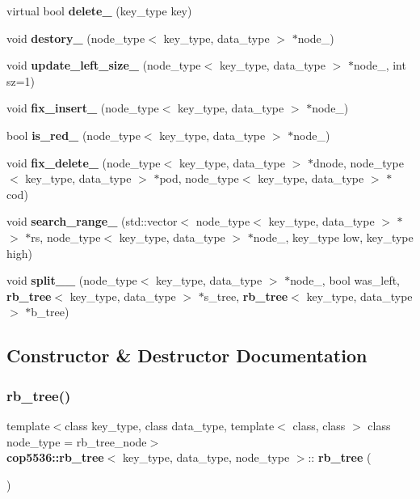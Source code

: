 \begin{DoxyCompactItemize}
\item 
virtual bool \textbf{ delete\+\_\+} (key\+\_\+type key)
\item 
void \textbf{ destory\+\_\+} (node\+\_\+type$<$ key\+\_\+type, data\+\_\+type $>$ $\ast$node\+\_\+)
\item 
void \textbf{ update\+\_\+left\+\_\+size\+\_\+} (node\+\_\+type$<$ key\+\_\+type, data\+\_\+type $>$ $\ast$node\+\_\+, int sz=1)
\item 
void \textbf{ fix\+\_\+insert\+\_\+} (node\+\_\+type$<$ key\+\_\+type, data\+\_\+type $>$ $\ast$node\+\_\+)
\item 
bool \textbf{ is\+\_\+red\+\_\+} (node\+\_\+type$<$ key\+\_\+type, data\+\_\+type $>$ $\ast$node\+\_\+)
\item 
void \textbf{ fix\+\_\+delete\+\_\+} (node\+\_\+type$<$ key\+\_\+type, data\+\_\+type $>$ $\ast$dnode, node\+\_\+type$<$ key\+\_\+type, data\+\_\+type $>$ $\ast$pod, node\+\_\+type$<$ key\+\_\+type, data\+\_\+type $>$ $\ast$cod)
\item 
void \textbf{ search\+\_\+range\+\_\+} (std\+::vector$<$ node\+\_\+type$<$ key\+\_\+type, data\+\_\+type $>$ $\ast$ $>$ $\ast$rs, node\+\_\+type$<$ key\+\_\+type, data\+\_\+type $>$ $\ast$node\+\_\+, key\+\_\+type low, key\+\_\+type high)
\item 
void \textbf{ split\+\_\+\+\_\+} (node\+\_\+type$<$ key\+\_\+type, data\+\_\+type $>$ $\ast$node\+\_\+, bool was\+\_\+left, \textbf{ rb\+\_\+tree}$<$ key\+\_\+type, data\+\_\+type $>$ $\ast$s\+\_\+tree, \textbf{ rb\+\_\+tree}$<$ key\+\_\+type, data\+\_\+type $>$ $\ast$b\+\_\+tree)
\end{DoxyCompactItemize}


\subsection{Constructor \& Destructor Documentation}
\mbox{\label{classcop5536_1_1rb__tree_adcd88c0e48e263a07d944b78a5d40ac1}} 
\subsubsection{rb\_tree()\hspace{0.1cm}{\footnotesize\ttfamily [1/3]}}
{\footnotesize\ttfamily template$<$class key\+\_\+type, class data\+\_\+type, template$<$ class, class $>$ class node\+\_\+type = rb\+\_\+tree\+\_\+node$>$ \\
\textbf{ cop5536\+::rb\+\_\+tree}$<$ key\+\_\+type, data\+\_\+type, node\+\_\+type $>$\+::\textbf{ rb\+\_\+tree} (\begin{DoxyParamCaption}{ }\end{DoxyParamCaption})\hspace{0.3cm}{\ttfamily [inline]}}

